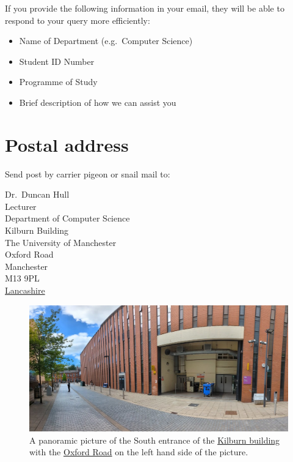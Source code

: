 \documentclass[
  12pt,
]{book}
\providecommand{\tightlist}{%
  \setlength{\itemsep}{0pt}\setlength{\parskip}{0pt}}
\begin{document}
If you provide the following information in your email, they will be able to respond to your query more efficiently:

\begin{itemize}
\tightlist
\item
  Name of Department (e.g.~Computer Science)
\item
  Student ID Number
\item
  Programme of Study
\item
  Brief description of how we can assist you
\end{itemize}

\hypertarget{postal}{%
\section{Postal address}\label{postal}}

Send post by carrier pigeon or snail mail to: 🐌

Dr.~Duncan Hull\\
Lecturer\\
Department of Computer Science\\
Kilburn Building\\
The University of Manchester\\
Oxford Road\\
Manchester\\
M13 9PL\\
\href{https://duncan.hull.name/2019/07/05/mancashire/}{Lancashire} 🌹

\begin{figure}

{\centering \includegraphics[width=1\linewidth]{images/kilburn-south-entrance} 

}

\caption{A panoramic picture of the South entrance of the \href{https://en.wikipedia.org/wiki/Kilburn_Building}{Kilburn building} with the \href{https://en.wikipedia.org/wiki/Wilmslow_Road}{Oxford Road} on the left hand side of the picture.}\label{fig:kilburnsouth-fig}
\end{figure}
\end{document}
